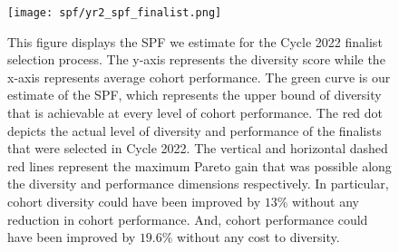 \begin{figure}[!hbtp]
    \centering
    \label{fig:spf_2022_full}
    \texttt{[image: spf/yr2\_spf\_finalist.png]} 
    \caption{This figure displays the SPF we estimate for the Cycle 2022 finalist selection process. The y-axis represents the diversity score while the x-axis represents average cohort performance. The green curve is our estimate of the SPF, which represents the upper bound of diversity that is achievable at every level of cohort performance. The red dot depicts the actual level of diversity and performance of the finalists that were selected in Cycle 2022. The vertical and horizontal dashed red lines represent the maximum Pareto gain that was possible along the diversity and performance dimensions respectively. In particular, cohort diversity could have been improved by $13\%$ without any reduction in cohort performance. And, cohort performance could have been improved by $19.6\%$ without any cost to diversity.}
\end{figure}



    
    
    
